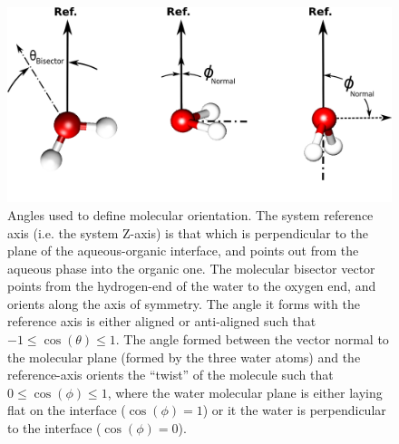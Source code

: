 \begin{figure}[h!]
\begin{center}
	\includegraphics[scale=1.0]{images/water-angles.png}
	\caption{Angles used to define molecular orientation. The system reference axis (i.e. the system Z-axis) is that which is perpendicular to the plane of the aqueous-organic interface, and points out from the aqueous phase into the organic one. The molecular bisector vector points from the hydrogen-end of the water to the oxygen end, and orients along the axis of symmetry. The angle it forms with the reference axis is either aligned or anti-aligned such that $-1\le \cos(\theta) \le 1$. The angle formed between the vector normal to the molecular plane (formed by the three water atoms) and the reference-axis orients the ``twist'' of the molecule such that $0 \le \cos(\phi) \le 1$, where the water molecular plane is either laying flat on the interface ($\cos(\phi)=1$) or it the water is perpendicular to the interface ($\cos(\phi)=0$).}
	\label{fig:water-angles}
\end{center}
\end{figure}



